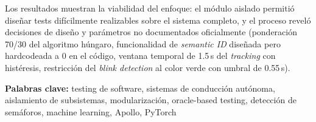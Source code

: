 \documentclass[a4paper,12pt]{report}
\begin{document}
Los resultados muestran la viabilidad del enfoque: el módulo aislado permitió diseñar tests difícilmente realizables sobre el sistema completo, y el proceso reveló decisiones de diseño y parámetros no documentados oficialmente (ponderación 70/30 del algoritmo húngaro, funcionalidad de \textit{semantic ID} diseñada pero hardcodeada a 0 en el código, ventana temporal de 1.5\,s del \textit{tracking} con histéresis, restricción del \textit{blink detection} al color verde con umbral de 0.55\,s).

\textbf{Palabras clave:} testing de software, sistemas de conducción autónoma, aislamiento de subsistemas, modularización, oracle-based testing, detección de semáforos, machine learning, Apollo, PyTorch

\newpage


\thispagestyle{empty}
\tableofcontents
\newpage


\listoffigures
\newpage
















\appendix


\end{document}
